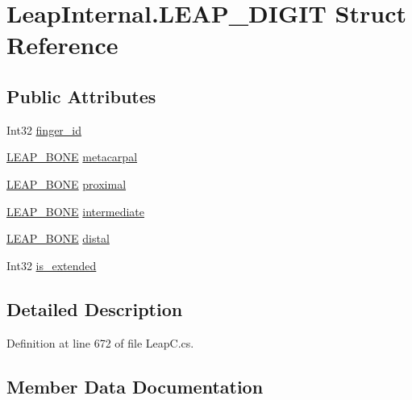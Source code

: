 \hypertarget{struct_leap_internal_1_1_l_e_a_p___d_i_g_i_t}{}\section{Leap\+Internal.\+L\+E\+A\+P\+\_\+\+D\+I\+G\+IT Struct Reference}
\label{struct_leap_internal_1_1_l_e_a_p___d_i_g_i_t}
\subsection*{Public Attributes}
\begin{DoxyCompactItemize}
\item 
Int32 \mbox{\hyperlink{struct_leap_internal_1_1_l_e_a_p___d_i_g_i_t_aca516fd920c9aaed185c48c486aec9ca}{finger\+\_\+id}}
\item 
\mbox{\hyperlink{struct_leap_internal_1_1_l_e_a_p___b_o_n_e}{L\+E\+A\+P\+\_\+\+B\+O\+NE}} \mbox{\hyperlink{struct_leap_internal_1_1_l_e_a_p___d_i_g_i_t_aec5b103588165347ef60bcd9093e7dac}{metacarpal}}
\item 
\mbox{\hyperlink{struct_leap_internal_1_1_l_e_a_p___b_o_n_e}{L\+E\+A\+P\+\_\+\+B\+O\+NE}} \mbox{\hyperlink{struct_leap_internal_1_1_l_e_a_p___d_i_g_i_t_a1d0ecc468f05a12d64099428f815aea6}{proximal}}
\item 
\mbox{\hyperlink{struct_leap_internal_1_1_l_e_a_p___b_o_n_e}{L\+E\+A\+P\+\_\+\+B\+O\+NE}} \mbox{\hyperlink{struct_leap_internal_1_1_l_e_a_p___d_i_g_i_t_ac552b8f9f01e565dbede479f5527ca4e}{intermediate}}
\item 
\mbox{\hyperlink{struct_leap_internal_1_1_l_e_a_p___b_o_n_e}{L\+E\+A\+P\+\_\+\+B\+O\+NE}} \mbox{\hyperlink{struct_leap_internal_1_1_l_e_a_p___d_i_g_i_t_a296a0b06a15d7aa3100ce12d2338766a}{distal}}
\item 
Int32 \mbox{\hyperlink{struct_leap_internal_1_1_l_e_a_p___d_i_g_i_t_a4ea304d37b3490e6250a5cc34682f089}{is\+\_\+extended}}
\end{DoxyCompactItemize}


\subsection{Detailed Description}


Definition at line 672 of file Leap\+C.\+cs.



\subsection{Member Data Documentation}
\mbox{\label{struct_leap_internal_1_1_l_e_a_p___d_i_g_i_t_a296a0b06a15d7aa3100ce12d2338766a}} 
